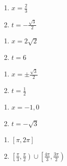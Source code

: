 \documentclass{ximera}
\begin{document}
\begin{multicols}{2}
\begin{enumerate}
\setcounter{enumi}{\value{HW}}

\item $x = \frac{2}{3}$ 
\item $t=-\frac{\sqrt{3}}{2}$

\setcounter{HW}{\value{enumi}}
\end{enumerate}
\end{multicols}


\begin{multicols}{2}
\begin{enumerate}
\setcounter{enumi}{\value{HW}}

\item  $x = 2\sqrt{2}$
\item  $t = 6$

\setcounter{HW}{\value{enumi}}
\end{enumerate}
\end{multicols}

\begin{multicols}{2}
\begin{enumerate}
\setcounter{enumi}{\value{HW}}

\item $x = \pm \frac{\sqrt{3}}{2}$
\item $t = \frac{1}{2}$ 

\setcounter{HW}{\value{enumi}}
\end{enumerate}
\end{multicols}

\begin{multicols}{2}
\begin{enumerate}
\setcounter{enumi}{\value{HW}}

\item $x = -1,0$
\item $t = -\sqrt{3}$

\setcounter{HW}{\value{enumi}}
\end{enumerate}
\end{multicols}

\begin{multicols}{2}

\begin{enumerate}

\setcounter{enumi}{\value{HW}}

\item $\left[ \pi, 2\pi \right]$ 
\item $\left[ \frac{\pi}{3}, \frac{\pi}{2} \right) \cup \left[ \frac{4\pi}{3}, \frac{3\pi}{2} \right)$

\setcounter{HW}{\value{enumi}}

\end{enumerate}

\end{multicols}
\end{document}
